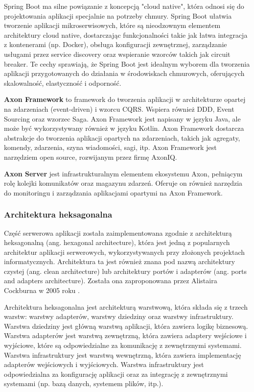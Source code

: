 Spring Boot ma silne powiązanie z koncepcją "cloud native", która odnosi się do projektowania aplikacji specjalnie na potrzeby chmury. Spring Boot ułatwia tworzenie aplikacji mikroserwisowych, które są nieodzownym elementem architektury cloud native, dostarczając funkcjonalności takie jak łatwa integracja z kontenerami (np. Docker), obsługa konfiguracji zewnętrznej, zarządzanie usługami przez service discovery oraz wspieranie wzorców takich jak circuit breaker. Te cechy sprawiają, że Spring Boot jest idealnym wyborem dla tworzenia aplikacji przygotowanych do działania w środowiskach chmurowych, oferujących skalowalność, elastyczność i odporność.

\textbf{Axon Framework} to framework do tworzenia aplikacji w architekturze opartej na zdarzeniach (event-driven) i wzorcu CQRS. Wspiera również DDD, Event Sourcing oraz wzorzec Saga. Axon Framework jest napisany w języku Java, ale może być wykorzystywany również w języku Kotlin. Axon Framework dostarcza abstrakcje do tworzenia aplikacji opartych na zdarzeniach, takich jak agregaty, komendy, zdarzenia, szyna wiadomości, sagi, itp. Axon Framework jest narzędziem open source, rozwijanym przez firmę AxonIQ.

\textbf{Axon Server} jest infrastrukturalnym elementem ekosystemu Axon, pełniącym rolę kolejki komunikatów oraz magazynu zdarzeń. Oferuje on również narzędzia do monitoringu i zarządzania aplikacjami opartymi na Axon Framework.

\subsubsection{Architektura heksagonalna}

Część serwerowa aplikacji została zaimplementowana zgodnie z architekturą heksagonalną (ang. hexagonal architecture), która jest jedną z popularnych architektur aplikacji serwerowych, wykorzystywanych przy złożonych projektach informatycznych. Architektura ta jest również znana pod nazwą architektury czystej (ang. clean architecture) lub architektury portów i adapterów (ang. ports and adapters architecture). Została ona zaproponowana przez Alistaira Cockburna w 2005 roku \cite{cockburn2005hexagonal}.

Architektura heksagonalna jest architekturą warstwową, która składa się z trzech warstw: warstwy adapterów, warstwy dziedziny oraz warstwy infrastruktury. Warstwa dziedziny jest główną warstwą aplikacji, która zawiera logikę biznesową. Warstwa adapterów jest warstwą zewnętrzną, która zawiera adaptery wejściowe i wyjściowe, które są odpowiedzialne za komunikację z zewnętrznymi systemami. Warstwa infrastruktury jest warstwą wewnętrzną, która zawiera implementację adapterów wejściowych i wyjściowych. Warstwa infrastruktury jest odpowiedzialna za konfigurację aplikacji oraz za integrację z zewnętrznymi systemami (np. bazą danych, systemem plików, itp.).

